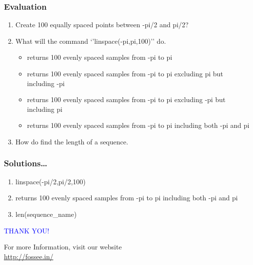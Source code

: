 \documentclass[presentation]{beamer}
\begin{document}
\begin{frame}
\frametitle{Evaluation}
\label{sec-7}


\begin{enumerate}
\item Create 100 equally spaced points between -pi/2 and pi/2?
\item What will the command `'linspace(-pi,pi,100)'' do.
\begin{itemize}
\item returns 100 evenly spaced samples from -pi to pi
\item returns 100 evenly spaced samples from -pi to pi excluding pi but including -pi
\item returns 100 evenly spaced samples from -pi to pi excluding -pi but including pi
\item returns 100 evenly spaced samples from -pi to pi including both -pi and pi
\end{itemize}
\item How do find the length of a sequence.
\end{enumerate}
\end{frame}
\begin{frame}
\frametitle{Solutions\ldots{}}
\label{sec-8}


\begin{enumerate}
\item linspace(-pi/2,pi/2,100)
\item returns 100 evenly spaced samples from -pi to pi including both -pi and pi
\item len(sequence\_name)
\end{enumerate}
\end{frame}
\begin{frame}

 \begin{block}{}
  \begin{center}
  \textcolor{blue}{\Large THANK YOU!} 
  \end{center}
  \end{block}
\begin{block}{}
  \begin{center}
    For more Information, visit our website\\
    \url{http://fossee.in/}
  \end{center}  
  \end{block}
\end{frame}
\end{document}
